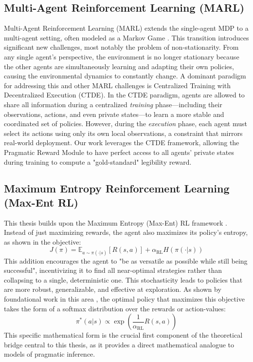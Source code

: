 \documentclass[12pt, a4paper]{report}
\newcommand{\AlphaRL}{\alpha_{\text{RL}}}
\begin{document}
\subsection{Multi-Agent Reinforcement Learning (MARL)}
Multi-Agent Reinforcement Learning (MARL) extends the single-agent MDP to a multi-agent setting, often modeled as a Markov Game \cite{OroojlooyJadid_Hajinezhad_2021}. This transition introduces significant new challenges, most notably the problem of non-stationarity. From any single agent's perspective, the environment is no longer stationary because the other agents are simultaneously learning and adapting their own policies, causing the environmental dynamics to constantly change. A dominant paradigm for addressing this and other MARL challenges is Centralized Training with Decentralized Execution (CTDE). In the CTDE paradigm, agents are allowed to share all information during a centralized \textit{training} phase---including their observations, actions, and even private states---to learn a more stable and coordinated set of policies. However, during the \textit{execution} phase, each agent must select its actions using only its own local observations, a constraint that mirrors real-world deployment. Our work leverages the CTDE framework, allowing the Pragmatic Reward Module to have perfect access to all agents' private states during training to compute a "gold-standard" legibility reward.

\subsection{Maximum Entropy Reinforcement Learning (Max-Ent RL)}
This thesis builds upon the Maximum Entropy (Max-Ent) RL framework \cite{jaynes1957information}. Instead of just maximizing rewards, the agent also maximizes its policy's entropy, as shown in the objective:
$$ J(\pi)=\mathbb{E}_{a\sim\pi(\cdot|s)}[R(s,a)]+\AlphaRL H(\pi(\cdot|s)) $$
This addition encourages the agent to "be as versatile as possible while still being successful", incentivizing it to find all near-optimal strategies rather than collapsing to a single, deterministic one. This stochasticity leads to policies that are more robust, generalizable, and effective at exploration. As shown by foundational work in this area \cite{Haarnoja2018, Levine2018}, the optimal policy that maximizes this objective takes the form of a softmax distribution over the rewards or action-values:
$$ \pi^*(a|s) \propto \exp\left(\frac{1}{\AlphaRL} R(s,a)\right) $$
This specific mathematical form is the crucial first component of the theoretical bridge central to this thesis, as it provides a direct mathematical analogue to models of pragmatic inference.
\end{document}
